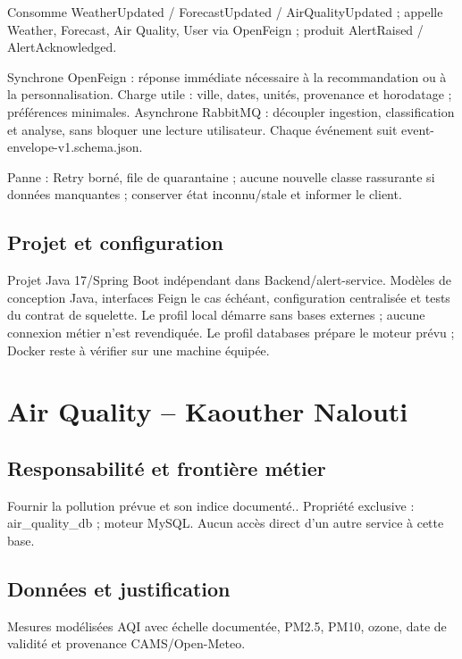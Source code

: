 \documentclass[10pt,a4paper]{article}
\begin{document}
Consomme WeatherUpdated / ForecastUpdated / AirQualityUpdated ; appelle Weather, Forecast, Air Quality, User via OpenFeign ; produit AlertRaised / AlertAcknowledged.\par

Synchrone OpenFeign : réponse immédiate nécessaire à la recommandation ou à la personnalisation. Charge utile : ville, dates, unités, provenance et horodatage ; préférences minimales. Asynchrone RabbitMQ : découpler ingestion, classification et analyse, sans bloquer une lecture utilisateur. Chaque événement suit event-envelope-v1.schema.json.\par

Panne : Retry borné, file de quarantaine ; aucune nouvelle classe rassurante si données manquantes ; conserver état inconnu/stale et informer le client.\par

\subsection*{Projet et configuration}

Projet Java 17/Spring Boot indépendant dans Backend/alert-service. Modèles de conception Java, interfaces Feign le cas échéant, configuration centralisée et tests du contrat de squelette. Le profil local démarre sans bases externes ; aucune connexion métier n'est revendiquée. Le profil databases prépare le moteur prévu ; Docker reste à vérifier sur une machine équipée.\par
\clearpage
\section*{Air Quality  --  Kaouther Nalouti}

\subsection*{Responsabilité et frontière métier}

Fournir la pollution prévue et son indice documenté.. Propriété exclusive : air\_quality\_db ; moteur MySQL. Aucun accès direct d'un autre service à cette base.\par

\subsection*{Données et justification}

Mesures modélisées AQI avec échelle documentée, PM2.5, PM10, ozone, date de validité et provenance CAMS/Open-Meteo.\par
\end{document}
